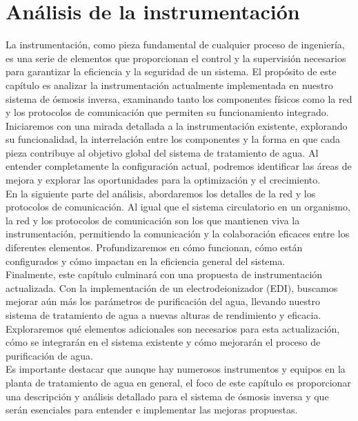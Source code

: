 \chapter{Análisis de la instrumentación}

La instrumentación, como pieza fundamental de cualquier proceso de ingeniería, es una serie de
elementos que proporcionan el control y la supervisión necesarios para garantizar la eficiencia y la
seguridad de un sistema. El propósito de este capítulo es analizar la instrumentación actualmente
implementada en nuestro sistema de ósmosis inversa, examinando tanto los componentes físicos
como la red y los protocolos de comunicación que permiten su funcionamiento integrado.\\

Iniciaremos con una mirada detallada a la instrumentación existente, explorando su funcionalidad,
la interrelación entre los componentes y la forma en que cada pieza contribuye al objetivo global del
sistema de tratamiento de agua. Al entender completamente la configuración actual, podremos identificar
las áreas de mejora y explorar las oportunidades para la optimización y el crecimiento.\\

En la siguiente parte del análisis, abordaremos los detalles de la red y los protocolos de
comunicación. Al igual que el sistema circulatorio en un organismo, la red y los protocolos de
comunicación son los que mantienen viva la instrumentación, permitiendo la comunicación y la colaboración
eficaces entre los diferentes elementos. Profundizaremos en cómo funcionan, cómo están configurados y
cómo impactan en la eficiencia general del sistema.\\

Finalmente, este capítulo culminará con una propuesta de instrumentación actualizada. Con la
implementación de un electrodeionizador (EDI), buscamos mejorar aún más los parámetros de purificación del agua,
llevando nuestro sistema de tratamiento de agua a nuevas alturas de rendimiento y eficacia. Exploraremos qué
elementos adicionales son necesarios para esta actualización, cómo se integrarán en el sistema existente y cómo
mejorarán el proceso de purificación de agua.\\

Es importante destacar que aunque hay numerosos instrumentos y equipos en la planta de tratamiento de agua en general,
el foco de este capítulo es proporcionar una descripción y análisis detallado  para el sistema
de ósmosis inversa y que serán esenciales para entender e implementar las mejoras propuestas.\\









